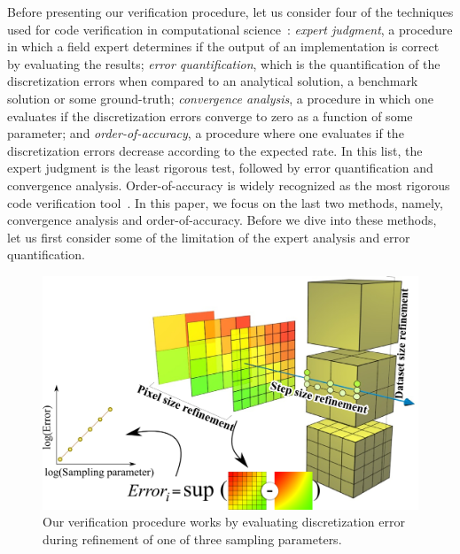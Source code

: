 Before presenting our verification procedure, let us consider four of
the techniques used for code verification in computational
science~\cite{Roy2005}: \emph{expert judgment}, a procedure in which a
field expert determines if the output of an implementation is correct
by evaluating the results; \emph{error quantification}, which is the
quantification of the discretization errors when compared to an
analytical solution, a benchmark solution or some ground-truth;
\emph{convergence analysis}, a procedure in which one evaluates if the
discretization errors converge to zero as a function of some
parameter; and \emph{order-of-accuracy}, a procedure where one
evaluates if the discretization errors decrease according to the
expected rate. In this list, the expert judgment is the least rigorous
test, followed by error quantification and convergence analysis. 
Order-of-accuracy is widely recognized as the most rigorous code
verification tool~\cite{babuska04, KnuppSalari02, roach98,
  Roy2005}. In this paper, we focus on the last two methods, namely,
convergence analysis and order-of-accuracy. Before we dive into these
methods, let us first consider some of the limitation of the expert
analysis and error quantification.
\begin{figure}
\centering
\includegraphics[width=0.8\linewidth]{chapter5/figures/refinement.png}
\caption{\label{fig:verification-procedure} Our verification procedure
  works by evaluating discretization error during refinement
  of one of three sampling parameters. }
\end{figure}

